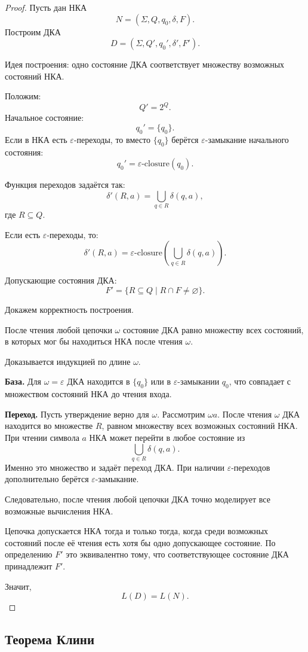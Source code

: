 \documentclass[12pt,a4paper]{article}
\newcommand{\eps}{\varepsilon}
\begin{document}
\begin{proof}
Пусть дан НКА
\[
N=(\Sigma,Q,q_0,\delta,F).
\]
Построим ДКА
\[
D=(\Sigma,Q',q_0',\delta',F').
\]

Идея построения: одно состояние ДКА соответствует множеству возможных состояний НКА.

Положим:
\[
Q'=2^Q.
\]
Начальное состояние:
\[
q_0'=\{q_0\}.
\]
Если в НКА есть $\eps$-переходы, то вместо $\{q_0\}$ берётся $\eps$-замыкание начального состояния:
\[
q_0'=\eps\text{-closure}(q_0).
\]

Функция переходов задаётся так:
\[
\delta'(R,a)=\bigcup_{q\in R}\delta(q,a),
\]
где $R\subseteq Q$.

Если есть $\eps$-переходы, то:
\[
\delta'(R,a)=\eps\text{-closure}\left(\bigcup_{q\in R}\delta(q,a)\right).
\]

Допускающие состояния ДКА:
\[
F'=\{R\subseteq Q\mid R\cap F\ne\varnothing\}.
\]

Докажем корректность построения.

После чтения любой цепочки $\omega$ состояние ДКА равно множеству всех состояний, в которых мог бы находиться НКА после чтения $\omega$.

Доказывается индукцией по длине $\omega$.

\textbf{База.} Для $\omega=\eps$ ДКА находится в $\{q_0\}$ или в $\eps$-замыкании $q_0$, что совпадает с множеством состояний НКА до чтения входа.

\textbf{Переход.} Пусть утверждение верно для $\omega$. Рассмотрим $\omega a$.
После чтения $\omega$ ДКА находится во множестве $R$, равном множеству всех возможных состояний НКА. При чтении символа $a$ НКА может перейти в любое состояние из
\[
\bigcup_{q\in R}\delta(q,a).
\]
Именно это множество и задаёт переход ДКА. При наличии $\eps$-переходов дополнительно берётся $\eps$-замыкание.

Следовательно, после чтения любой цепочки ДКА точно моделирует все возможные вычисления НКА.

Цепочка допускается НКА тогда и только тогда, когда среди возможных состояний после её чтения есть хотя бы одно допускающее состояние. По определению $F'$ это эквивалентно тому, что соответствующее состояние ДКА принадлежит $F'$.

Значит,
\[
L(D)=L(N).
\]
\end{proof}

\subsection{Теорема Клини}
\end{document}
